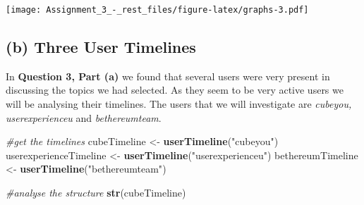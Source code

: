 \documentclass[]{article}
\newenvironment{Shaded}{\begin{snugshade}}{\end{snugshade}}
\newcommand{\KeywordTok}[1]{\textcolor[rgb]{0.13,0.29,0.53}{\textbf{#1}}}
\newcommand{\StringTok}[1]{\textcolor[rgb]{0.31,0.60,0.02}{#1}}
\newcommand{\CommentTok}[1]{\textcolor[rgb]{0.56,0.35,0.01}{\textit{#1}}}
\newcommand{\NormalTok}[1]{#1}
\begin{document}
\texttt{[image: Assignment\_3\_-\_rest\_files/figure-latex/graphs-3.pdf]}

\subsection{(b) Three User Timelines}\label{b-three-user-timelines}

In \textbf{Question 3, Part (a)} we found that several users were very
present in discussing the topics we had selected. As they seem to be
very active users we will be analysing their timelines. The users that
we will investigate are \emph{cubeyou, userexperienceu} and
\emph{bethereumteam}.

\begin{Shaded}
\begin{Highlighting}[]
\CommentTok{#get the timelines}
\NormalTok{cubeTimeline <-}\StringTok{ }\KeywordTok{userTimeline}\NormalTok{(}\StringTok{"cubeyou"}\NormalTok{)}
\NormalTok{userexperienceTimeline <-}\StringTok{ }\KeywordTok{userTimeline}\NormalTok{(}\StringTok{"userexperienceu"}\NormalTok{)}
\NormalTok{bethereumTimeline <-}\StringTok{ }\KeywordTok{userTimeline}\NormalTok{(}\StringTok{"bethereumteam"}\NormalTok{)}

\CommentTok{#analyse the structure}
\KeywordTok{str}\NormalTok{(cubeTimeline)}
\end{Highlighting}
\end{Shaded}
\end{document}
